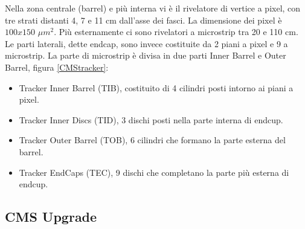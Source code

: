 Nella zona centrale (barrel) e più interna vi è il rivelatore di vertice a pixel, con tre strati distanti 4, 7 e 11 cm dall'asse dei fasci. La dimensione dei pixel è $100x150$ $\mu m^2$. Più esternamente ci sono rivelatori a microstrip tra 20 e 110 cm. Le parti laterali, dette endcap, sono invece costituite da 2 piani a pixel e 9 a microstrip. La parte di microstrip è divisa in due parti Inner Barrel e Outer Barrel, figura \ref{CMStracker}:
\begin{itemize}
\item Tracker Inner Barrel (TIB), costituito di 4 cilindri posti intorno ai piani a pixel.
\item Tracker Inner Discs (TID), 3 dischi posti nella parte interna di endcup.
\item Tracker Outer Barrel (TOB), 6 cilindri che formano la parte esterna del barrel.
\item Tracker EndCaps (TEC), 9 dischi che completano la parte più esterna di endcup.
\end{itemize}

\subsection{CMS Upgrade}
